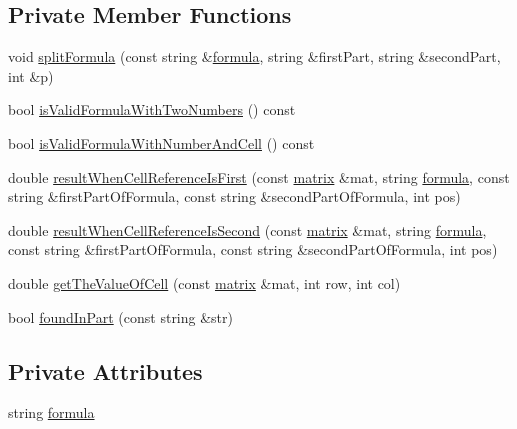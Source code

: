 \subsection*{Private Member Functions}
\begin{DoxyCompactItemize}
\item 
void \hyperlink{class_formula_ae9390fbc99e5ade644589b144c73bfb7}{split\+Formula} (const string \&\hyperlink{class_formula_a2a3b5b998b48db1fadf57752e59ed4fb}{formula}, string \&first\+Part, string \&second\+Part, int \&p)
\item 
bool \hyperlink{class_formula_adada9416ff44be9f258b73eb1d4e1533}{is\+Valid\+Formula\+With\+Two\+Numbers} () const
\item 
bool \hyperlink{class_formula_aa898bedad69074a59857490ccca37cd7}{is\+Valid\+Formula\+With\+Number\+And\+Cell} () const
\item 
double \hyperlink{class_formula_a9a27ccdd3ee3143b1f6e541ec3c6a0ec}{result\+When\+Cell\+Reference\+Is\+First} (const \hyperlink{formula_8h_a869e2a5deeb3daa4c82d6bc91cf20d92}{matrix} \&mat, string \hyperlink{class_formula_a2a3b5b998b48db1fadf57752e59ed4fb}{formula}, const string \&first\+Part\+Of\+Formula, const string \&second\+Part\+Of\+Formula, int pos)
\item 
double \hyperlink{class_formula_ae0edae33b4af295bab04f1f1c06f406f}{result\+When\+Cell\+Reference\+Is\+Second} (const \hyperlink{formula_8h_a869e2a5deeb3daa4c82d6bc91cf20d92}{matrix} \&mat, string \hyperlink{class_formula_a2a3b5b998b48db1fadf57752e59ed4fb}{formula}, const string \&first\+Part\+Of\+Formula, const string \&second\+Part\+Of\+Formula, int pos)
\item 
double \hyperlink{class_formula_a8080ff3cf8fce2d9f1730e772ae21c71}{get\+The\+Value\+Of\+Cell} (const \hyperlink{formula_8h_a869e2a5deeb3daa4c82d6bc91cf20d92}{matrix} \&mat, int row, int col)
\item 
bool \hyperlink{class_formula_a79079cea46f8320cd7a63f576251baac}{found\+In\+Part} (const string \&str)
\end{DoxyCompactItemize}
\subsection*{Private Attributes}
\begin{DoxyCompactItemize}
\item 
string \hyperlink{class_formula_a2a3b5b998b48db1fadf57752e59ed4fb}{formula}
\end{DoxyCompactItemize}


